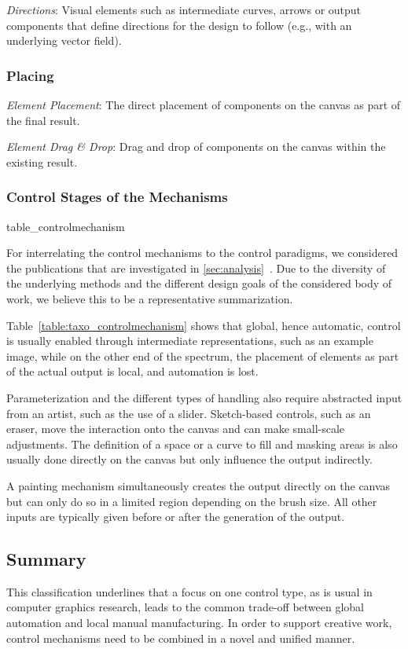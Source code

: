 \textit{Directions}: Visual elements such as intermediate curves, arrows or output components that define directions for the design to follow (e.g., with an underlying vector field).


\subsubsection{Placing}


\textit{Element Placement}: The direct placement of components on the canvas as part of the final result.

\textit{Element Drag \& Drop}: Drag and drop of components on the canvas within the existing result.


\subsubsection{Control Stages of the Mechanisms}
\label{subsec:taxo_control_stages}

{table_controlmechanism}

For interrelating the control mechanisms to the control paradigms, we considered the publications that are investigated in \cref{sec:analysis}~. Due to the diversity of the underlying methods and the different design goals of the considered body of work, we believe this to be a representative summarization.


Table~\ref{table:taxo_controlmechanism} shows that global, hence automatic, control is usually enabled through intermediate representations, such as an example image, while on the other end of the spectrum, the placement of elements as part of the actual output is local, and automation is lost.

Parameterization and the different types of handling also require abstracted input from an artist, such as the use of a slider. Sketch-based controls, such as an eraser, move the interaction onto the canvas and can make small-scale adjustments. The definition of a space or a curve to fill and masking areas is also usually done directly on the canvas but only influence the output indirectly.

A painting mechanism simultaneously creates the output directly on the canvas but can only do so in a limited region depending on the brush size. All other inputs are typically given before or after the generation of the output.

\subsection{Summary}
\label{subsec:taxonomy_summary}

This classification underlines that a focus on one control type, as is usual in computer graphics research, leads to the common trade-off between global automation and local manual manufacturing. In order to support creative work, control mechanisms need to be combined in a novel and unified manner.

